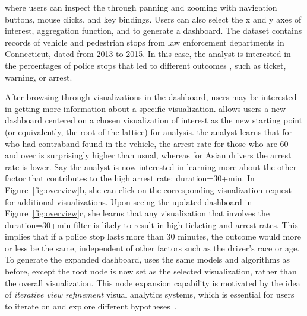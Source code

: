 where users can inspect the  
through panning and zooming with navigation buttons, 
mouse clicks, and key bindings. 
Users can also select the x and y axes of interest, 
aggregation function, and  
to generate a dashboard. 
The dataset contains records of vehicle and pedestrian stops from law enforcement departments in Connecticut, dated from 2013 to 2015. In this case, the analyst is interested in the percentages of police stops  that led to different outcomes , such as ticket, warning, or arrest. 

After browsing through visualizations in the dashboard, 
users may be interested in getting more information 
about a specific visualization. 
\system allows users  
a new dashboard centered on a chosen visualization 
of interest as the new starting point 
(or equivalently, the root of the lattice) 
for analysis. 
the analyst learns that for  
who had contraband found in the vehicle, the arrest rate for those who are 60 and over is surprisingly higher than usual, whereas for Asian drivers the arrest rate is lower. Say the analyst is now interested in learning more about the other factor that contributes to the high arrest rate: duration=30+min. In Figure~\ref{fig:overview}b, she can click on the corresponding visualization  request for additional visualizations. Upon seeing the updated dashboard in Figure~\ref{fig:overview}c, she learns that any visualization that involves the duration=30+min filter is likely to result in high ticketing and arrest rates. This implies that if a police stop lasts more than 30 minutes, the outcome would more or less be the same, independent of other factors such as the driver's race or age. To generate the expanded dashboard, \system uses the same models and algorithms as before, except the root node is now set as the selected visualization, rather than the overall visualization. This node expansion capability is motivated by the idea of \textit{iterative view refinement}  visual analytics systems, which is essential for users to iterate on and explore different hypotheses~\cite{Hoque2017,Wongsuphasawat2016}.
